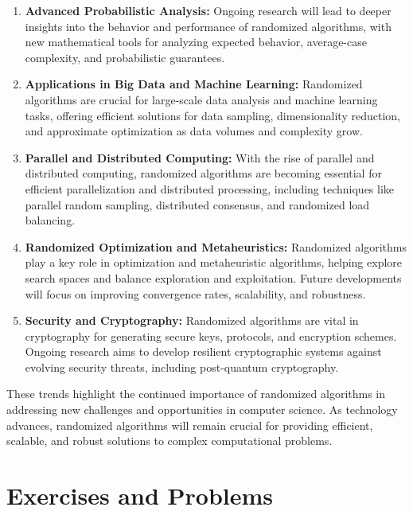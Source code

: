 \documentclass[12pt]{book} %
\begin{document}
\begin{enumerate}
    \item \textbf{Advanced Probabilistic Analysis:} Ongoing research will lead to deeper insights into the behavior and performance of randomized algorithms, with new mathematical tools for analyzing expected behavior, average-case complexity, and probabilistic guarantees.
    
    \item \textbf{Applications in Big Data and Machine Learning:} Randomized algorithms are crucial for large-scale data analysis and machine learning tasks, offering efficient solutions for data sampling, dimensionality reduction, and approximate optimization as data volumes and complexity grow.
    
    \item \textbf{Parallel and Distributed Computing:} With the rise of parallel and distributed computing, randomized algorithms are becoming essential for efficient parallelization and distributed processing, including techniques like parallel random sampling, distributed consensus, and randomized load balancing.
    
    \item \textbf{Randomized Optimization and Metaheuristics:} Randomized algorithms play a key role in optimization and metaheuristic algorithms, helping explore search spaces and balance exploration and exploitation. Future developments will focus on improving convergence rates, scalability, and robustness.
    
    \item \textbf{Security and Cryptography:} Randomized algorithms are vital in cryptography for generating secure keys, protocols, and encryption schemes. Ongoing research aims to develop resilient cryptographic systems against evolving security threats, including post-quantum cryptography.
\end{enumerate}

These trends highlight the continued importance of randomized algorithms in addressing new challenges and opportunities in computer science. As technology advances, randomized algorithms will remain crucial for providing efficient, scalable, and robust solutions to complex computational problems.



\section{Exercises and Problems}
\end{document}
